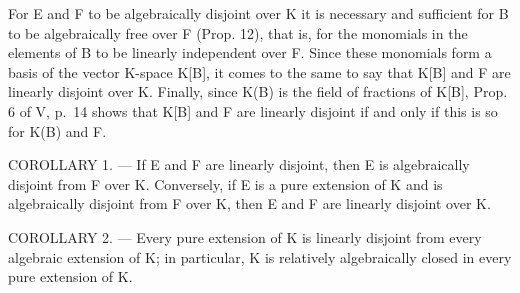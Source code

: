 For E and F to be algebraically disjoint over K it is necessary and sufficient for B to be algebraically free over F (Prop. 12), that is, for the monomials in the elements of B to be linearly independent over F. Since these monomials form a basis of the vector K-space K{[}B{]}, it comes to the same to say that K{[}B{]} and F are linearly disjoint over K. Finally, since K(B) is the field of fractions of K{[}B{]}, Prop. 6 of V, p.~14 shows that K{[}B{]} and F are linearly disjoint if and only if this is so for K(B) and F.

COROLLARY 1. --- If E and F are linearly disjoint, then E is algebraically disjoint from F over K. Conversely, if E is a pure extension of K and is algebraically disjoint from F over K, then E and F are linearly disjoint over K.

COROLLARY 2. --- Every pure extension of K is linearly disjoint from every algebraic extension of K; in particular, K is relatively algebraically closed in every pure extension of K.

